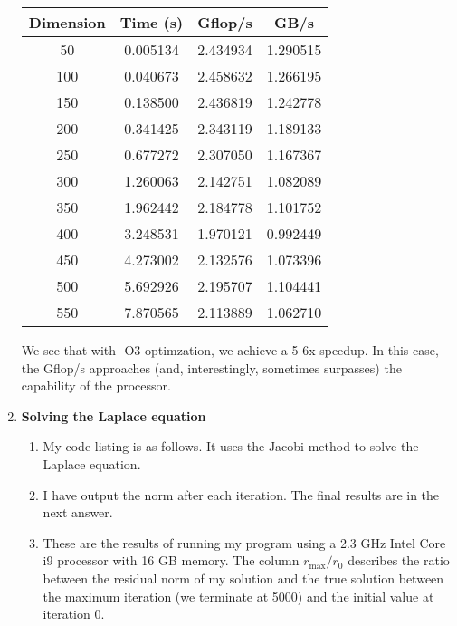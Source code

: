 \documentclass[12]{article}
\begin{document}
\begin{enumerate}[label=\textbf{\arabic*}.]
    \vspace{1em}
    \begin{tabular}{ c | c c c }         
	Dimension & Time (s) &  Gflop/s  & GB/s \\
	\hline
         50 &   0.005134 &   2.434934 &   1.290515 \\
       100 &   0.040673 &   2.458632 &   1.266195 \\
       150 &   0.138500 &   2.436819 &   1.242778 \\
       200 &   0.341425 &   2.343119 &   1.189133 \\
       250 &   0.677272 &   2.307050 &   1.167367 \\
       300 &   1.260063 &   2.142751 &   1.082089 \\
       350 &   1.962442 &   2.184778 &   1.101752 \\
       400 &   3.248531 &   1.970121 &   0.992449 \\
       450 &   4.273002 &   2.132576 &   1.073396 \\
       500 &   5.692926 &   2.195707 &   1.104441 \\
       550 &   7.870565 &   2.113889 &   1.062710 \\
    \end{tabular}
    \vspace{1em}

    We see that with -O3 optimzation, we achieve a 5-6x speedup.
    In this case, the Gflop/s approaches (and, interestingly, sometimes surpasses) the capability of the processor.

\item \textbf{Solving the Laplace equation}

\begin{enumerate}[label=\alph*.]
    \item My code listing is as follows. It uses the Jacobi method to solve the Laplace equation.
    
     	
	        
    \item I have output the norm after each iteration. The final results are in the next answer.
    \item These are the results of running my program using a 2.3 GHz Intel Core i9 processor with 16 GB memory.
    The column $r_\mathrm{max}/r_0$ describes the ratio between the residual norm of my solution and the true solution between the maximum iteration (we terminate at 5000) and the initial value at iteration 0. 
    

\end{enumerate}
\end{enumerate}
\end{document}
